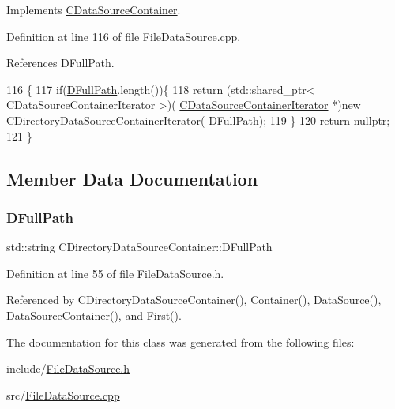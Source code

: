 Implements \hyperlink{classCDataSourceContainer_ad50184dd4ec1c79c776fe0d7d9910925}{C\+Data\+Source\+Container}.



Definition at line 116 of file File\+Data\+Source.\+cpp.



References D\+Full\+Path.


\begin{DoxyCode}
116                                                                                   \{
117     \textcolor{keywordflow}{if}(\hyperlink{classCDirectoryDataSourceContainer_ac3d3c7e7d7bc9f68ba8a8747a3dee8b5}{DFullPath}.length())\{
118         \textcolor{keywordflow}{return} (std::shared\_ptr< CDataSourceContainerIterator >)(
      \hyperlink{classCDataSourceContainerIterator}{CDataSourceContainerIterator} *)\textcolor{keyword}{new} 
      \hyperlink{classCDirectoryDataSourceContainerIterator}{CDirectoryDataSourceContainerIterator}(
      \hyperlink{classCDirectoryDataSourceContainer_ac3d3c7e7d7bc9f68ba8a8747a3dee8b5}{DFullPath});
119     \}
120     \textcolor{keywordflow}{return} \textcolor{keyword}{nullptr};
121 \}
\end{DoxyCode}


\subsection{Member Data Documentation}
\hypertarget{classCDirectoryDataSourceContainer_ac3d3c7e7d7bc9f68ba8a8747a3dee8b5}{}\label{classCDirectoryDataSourceContainer_ac3d3c7e7d7bc9f68ba8a8747a3dee8b5} 
\subsubsection{\texorpdfstring{D\+Full\+Path}{DFullPath}}
{\footnotesize\ttfamily std\+::string C\+Directory\+Data\+Source\+Container\+::\+D\+Full\+Path\hspace{0.3cm}{\ttfamily [protected]}}



Definition at line 55 of file File\+Data\+Source.\+h.



Referenced by C\+Directory\+Data\+Source\+Container(), Container(), Data\+Source(), Data\+Source\+Container(), and First().



The documentation for this class was generated from the following files\+:\begin{DoxyCompactItemize}
\item 
include/\hyperlink{FileDataSource_8h}{File\+Data\+Source.\+h}\item 
src/\hyperlink{FileDataSource_8cpp}{File\+Data\+Source.\+cpp}\end{DoxyCompactItemize}
